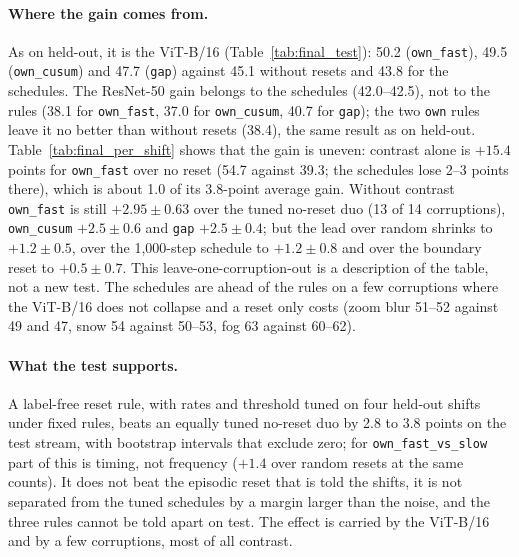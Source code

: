 \documentclass[10pt]{article}
\newcommand{\rl}[1]{\texttt{#1}}
\newcommand{\vit}{ViT-B/16}
\newcommand{\rn}{ResNet-50}
\begin{document}
\paragraph{Where the gain comes from.} As on held-out, it is the \vit{} (Table~\ref{tab:final_test}): 50.2 (\rl{own\_fast}), 49.5 (\rl{own\_cusum}) and 47.7 (\rl{gap}) against 45.1 without resets and 43.8 for the schedules. The \rn{} gain belongs to the schedules (42.0--42.5), not to the rules (38.1 for \rl{own\_fast}, 37.0 for \rl{own\_cusum}, 40.7 for \rl{gap}); the two \rl{own} rules leave it no better than without resets (38.4), the same result as on held-out. Table~\ref{tab:final_per_shift} shows that the gain is uneven: contrast alone is $+15.4$ points for \rl{own\_fast} over no reset (54.7 against 39.3; the schedules lose 2--3 points there), which is about 1.0 of its 3.8-point average gain. Without contrast \rl{own\_fast} is still $+2.95 \pm 0.63$ over the tuned no-reset duo (13 of 14 corruptions), \rl{own\_cusum} $+2.5 \pm 0.6$ and \rl{gap} $+2.5 \pm 0.4$; but the lead over random shrinks to $+1.2 \pm 0.5$, over the 1,000-step schedule to $+1.2 \pm 0.8$ and over the boundary reset to $+0.5 \pm 0.7$. This leave-one-corruption-out is a description of the table, not a new test. The schedules are ahead of the rules on a few corruptions where the \vit{} does not collapse and a reset only costs (zoom blur 51--52 against 49 and 47, snow 54 against 50--53, fog 63 against 60--62).

\paragraph{What the test supports.} A label-free reset rule, with rates and threshold tuned on four held-out shifts under fixed rules, beats an equally tuned no-reset duo by 2.8 to 3.8 points on the test stream, with bootstrap intervals that exclude zero; for \rl{own\_fast\_vs\_slow} part of this is timing, not frequency ($+1.4$ over random resets at the same counts). It does not beat the episodic reset that is told the shifts, it is not separated from the tuned schedules by a margin larger than the noise, and the three rules cannot be told apart on test. The effect is carried by the \vit{} and by a few corruptions, most of all contrast.


\end{document}
